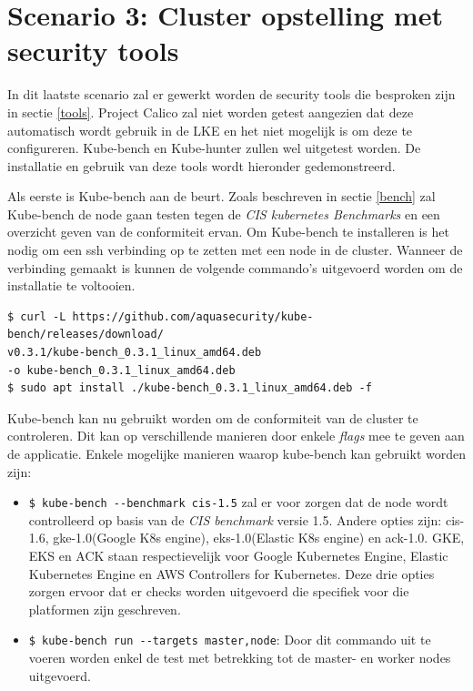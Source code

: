 \clearpage
\section{Scenario 3: Cluster opstelling met security tools}
In dit laatste scenario zal er gewerkt worden de security tools die besproken zijn in sectie \ref{tools}. Project Calico zal niet worden getest aangezien dat deze automatisch wordt gebruik in de LKE en het niet mogelijk is om deze te configureren. Kube-bench en Kube-hunter zullen wel uitgetest worden. De installatie en gebruik van deze tools wordt hieronder gedemonstreerd.

Als eerste is Kube-bench aan de beurt. Zoals beschreven in sectie \ref{bench} zal Kube-bench de node gaan testen tegen de \textit{CIS kubernetes Benchmarks} en een overzicht geven van de conformiteit ervan. Om Kube-bench te installeren is het nodig om een ssh verbinding op te zetten met een node in de cluster. Wanneer de verbinding gemaakt is kunnen de volgende commando's uitgevoerd worden om de installatie te voltooien.

\begin{verbatim} 
$ curl -L https://github.com/aquasecurity/kube-bench/releases/download/
v0.3.1/kube-bench_0.3.1_linux_amd64.deb
-o kube-bench_0.3.1_linux_amd64.deb
$ sudo apt install ./kube-bench_0.3.1_linux_amd64.deb -f
\end{verbatim}

Kube-bench kan nu gebruikt worden om de conformiteit van de cluster te controleren. Dit kan op verschillende manieren door enkele \textit{flags} mee te geven aan de applicatie. Enkele mogelijke manieren waarop kube-bench kan gebruikt worden zijn:
\begin{itemize}
	\item \verb|$ kube-bench --benchmark cis-1.5| zal er voor zorgen dat de node wordt controlleerd op basis van de \textit{CIS benchmark} versie 1.5. Andere opties zijn: cis-1.6, gke-1.0(Google K8s engine), eks-1.0(Elastic K8s engine) en ack-1.0. GKE, EKS en ACK staan respectievelijk voor Google Kubernetes Engine, Elastic Kubernetes Engine en AWS Controllers for Kubernetes. Deze drie opties zorgen ervoor dat er checks worden uitgevoerd die specifiek voor die platformen zijn geschreven.
	\item \verb|$ kube-bench run --targets master,node|: Door dit commando uit te voeren worden enkel de test met betrekking tot de master- en worker nodes uitgevoerd.
\end{itemize}

